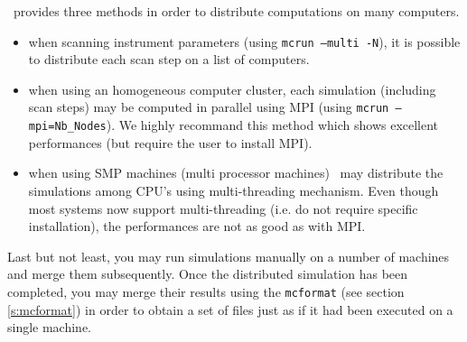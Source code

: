 \MCS\ provides three methods in order to distribute computations on many computers.
\begin{itemize}
\item when scanning instrument parameters (using \texttt{mcrun --multi -N}),
  it is possible to distribute each scan step on a list of computers.
\item when using an homogeneous computer cluster, each simulation (including scan
  steps) may be computed in parallel using MPI (using \texttt{mcrun
    --mpi=Nb\_Nodes}). We highly recommand this method which shows
  excellent performances (but require the user to install MPI).
\item when using SMP machines (multi processor machines) \MCS\ may
  distribute the simulations among CPU's using multi-threading
  mechanism. Even though most systems now support multi-threading (i.e. do not require specific installation), the performances are not as good as with MPI.
\end{itemize}

Last but not least, you may run simulations manually on a number of machines and merge them subsequently.
Once the distributed simulation has been completed, you may merge their results using the \verb+mcformat+ (see section \ref{s:mcformat})  in order to obtain a set of files just as if it had been executed on a single machine.

